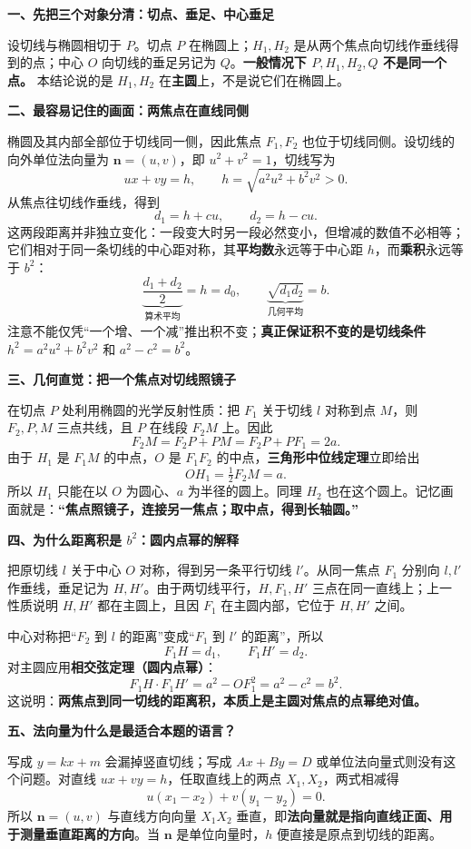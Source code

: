 \begin{explanationbox}
\textbf{一、先把三个对象分清：切点、垂足、中心垂足}

设切线与椭圆相切于 $P$。切点 $P$ 在椭圆上；$H_1,H_2$ 是从两个焦点向切线作垂线得到的点；中心 $O$ 向切线的垂足另记为 $Q$。\textbf{一般情况下 $P,H_1,H_2,Q$ 不是同一个点。} 本结论说的是 $H_1,H_2$ 在\textbf{主圆}上，不是说它们在椭圆上。

\textbf{二、最容易记住的画面：两焦点在直线同侧}

椭圆及其内部全部位于切线同一侧，因此焦点 $F_1,F_2$ 也位于切线同侧。设切线的向外单位法向量为 $\boldsymbol n=(u,v)$，即 $u^2+v^2=1$，切线写为
\[
ux+vy=h,\qquad h=\sqrt{a^2u^2+b^2v^2}>0.
\]
从焦点往切线作垂线，得到
\[
d_1=h+cu,\qquad d_2=h-cu.
\]
这两段距离并非独立变化：一段变大时另一段必然变小，但增减的数值不必相等；它们相对于同一条切线的中心距对称，其\textbf{平均数}永远等于中心距 $h$，而\textbf{乘积}永远等于 $b^2$：
\[
\underbrace{\frac{d_1+d_2}{2}}_{\text{算术平均}}=h=d_0,
\qquad
\underbrace{\sqrt{d_1d_2}}_{\text{几何平均}}=b.
\]
注意不能仅凭“一个增、一个减”推出积不变；\textbf{真正保证积不变的是切线条件} $h^2=a^2u^2+b^2v^2$ 和 $a^2-c^2=b^2$。

\textbf{三、几何直觉：把一个焦点对切线照镜子}

在切点 $P$ 处利用椭圆的光学反射性质：把 $F_1$ 关于切线 $l$ 对称到点 $M$，则 $F_2,P,M$ 三点共线，且 $P$ 在线段 $F_2M$ 上。因此
\[
F_2M=F_2P+PM=F_2P+PF_1=2a.
\]
由于 $H_1$ 是 $F_1M$ 的中点，$O$ 是 $F_1F_2$ 的中点，\textbf{三角形中位线定理}立即给出
\[
\boxed{OH_1=\tfrac12 F_2M=a}.
\]
所以 $H_1$ 只能在以 $O$ 为圆心、$a$ 为半径的圆上。同理 $H_2$ 也在这个圆上。记忆画面就是：\textbf{“焦点照镜子，连接另一焦点；取中点，得到长轴圆。”}

\textbf{四、为什么距离积是 $b^2$：圆内点幂的解释}

把原切线 $l$ 关于中心 $O$ 对称，得到另一条平行切线 $l'$。从同一焦点 $F_1$ 分别向 $l,l'$ 作垂线，垂足记为 $H,H'$。由于两切线平行，$H,F_1,H'$ 三点在同一直线上；上一性质说明 $H,H'$ 都在主圆上，且因 $F_1$ 在主圆内部，它位于 $H,H'$ 之间。

中心对称把“$F_2$ 到 $l$ 的距离”变成“$F_1$ 到 $l'$ 的距离”，所以
\[
F_1H=d_1,\qquad F_1H'=d_2.
\]
对主圆应用\textbf{相交弦定理（圆内点幂）}：
\[
F_1H\cdot F_1H'=a^2-OF_1^2=a^2-c^2=b^2.
\]
这说明：\textbf{两焦点到同一切线的距离积，本质上是主圆对焦点的点幂绝对值。}

\textbf{五、法向量为什么是最适合本题的语言？}

写成 $y=kx+m$ 会漏掉竖直切线；写成 $Ax+By=D$ 或单位法向量式则没有这个问题。对直线 $ux+vy=h$，任取直线上的两点 $X_1,X_2$，两式相减得
\[
u(x_1-x_2)+v(y_1-y_2)=0.
\]
所以 $\boldsymbol n=(u,v)$ 与直线方向向量 $X_1X_2$ 垂直，即\textbf{法向量就是指向直线正面、用于测量垂直距离的方向}。当 $\boldsymbol n$ 是单位向量时，$h$ 便直接是原点到切线的距离。


\end{explanationbox}
